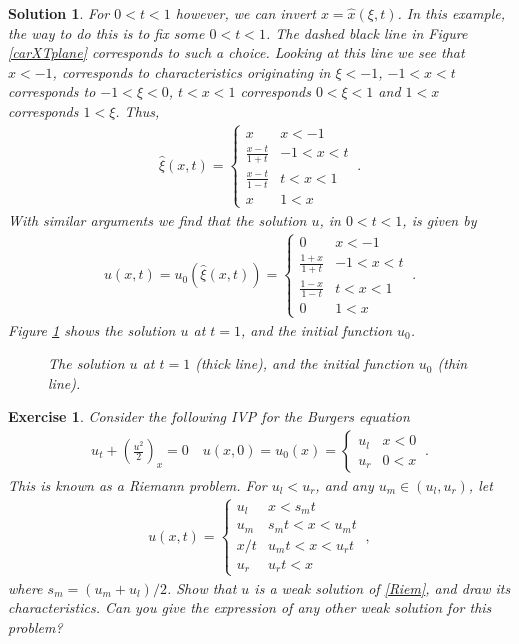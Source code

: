 \documentclass[10pt,letterpaper]{article}
\newcommand{\rb}[1]{ \left(  {#1} \right) }
\newcommand{\frb}[1]{ \left(  {#1} \right) }
\theoremstyle{break}
\newtheorem{exercise}{Exercise}
\newtheorem{mysolution}{Solution}
\newenvironment{solution}{\begin{mysolution}}{\end{mysolution}}
\begin{document}
\begin{solution}
	For $0<t<1$ however, we can invert $x=\hat x\frb{\xi,t}$.
	In this example, the way to do this is to fix some $0<t<1$.
	The dashed black line in Figure \ref{carXTplane} corresponds to such a choice.
	Looking at this line we see that $x<-1$, corresponds to characteristics originating in $\xi<-1$, $-1<x<t$ corresponds to $-1<\xi<0$, $t<x<1$ corresponds $0<\xi<1$ and $1<x$ corresponds $1<\xi$.
	Thus,
	\begin{gather}
		\hat \xi(x,t)=\begin{cases}
				x 	& 	  x<-1\\
				\frac{x-t}{1+t}  	& -1 < x<t\\
				\frac{x-t}{1-t} 	&  t< x<1\\
				x 	&  1 < x
			\end{cases}\ .
	\end{gather}
	With similar arguments we find that the solution $u$, in $0<t<1$, is given by
	\begin{gather}
		u(x,t)=u_0\frb{\hat\xi(x,t)}=
			\begin{cases}
				0 	& 	  x<-1\\
				\frac{1+x}{1+t}  	& -1 < x<t\\
				\frac{1-x}{1-t} 	&  t< x<1\\
				0 	&  1 < x
			\end{cases}\ .
	\end{gather}
	Figure \ref{u01} shows the solution $u$ at $t=1$, and the initial function $u_0$.
	\begin{figure}
	\centering
	\caption{The solution $u$ at $t=1$ (thick line), and the initial function $u_0$ (thin line).}
	\label{u01}
	\end{figure}
\end{solution}





\begin{exercise}
	Consider the following IVP for the Burgers equation
	\begin{gather} \label{Riem}
		u_t+\rb{\frac{u^2}{2}}_x=0
		\quad
		u(x,0)=u_0(x)=\begin{cases}
				u_l & x<0\\
				u_r & 0<x
			\end{cases}\ .
	\end{gather}%
	This is known as a \emph{Riemann problem}. 
	For $u_l<u_r$, and any $u_m\in\rb{u_l,u_r}$, let
	\begin{gather}%
		u(x,t)=\begin{cases}
				u_l & x<s_mt\\
				u_m & s_mt<x<u_mt\\
				x/t & u_mt<x<u_rt\\
				u_r & u_rt<x
			\end{cases}\ ,
	\end{gather}%
	where $s_m=(u_m+u_l)/2$.
	Show that $u$ is a weak solution of \eqref{Riem}, and draw its characteristics.
	Can you give the expression of any other weak solution for this problem?
\end{exercise}
\end{document}
